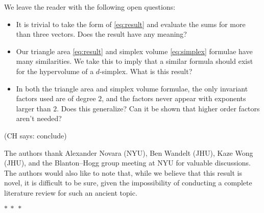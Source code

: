 \documentclass[12pt]{article}
\newcommand{\CH}[1]{{\color{blue} (CH says: #1)}}
\begin{document}
We leave the reader with the following open questions:
\begin{itemize}
    \item It is trivial to take the form of \eqref{eq:result} and evaluate the sums for more than three vectors. Does the result have any meaning?

    \item Our triangle area \eqref{eq:result} and simplex volume \eqref{eq:simplex} formulae have many similarities. We take this to imply that a similar formula should exist for the hypervolume of a $d$-simplex. What is this result?

    \item In both the triangle area and simplex volume formulae, the only invariant factors used are of degree $2$, and the factors never appear with exponents larger than $2$. Does this generalize? Can it be shown that higher order factors aren't needed?
\end{itemize}

\CH{conclude}

The authors thank Alexander Novara (NYU), Ben Wandelt (JHU), Kaze Wong (JHU), and the Blanton--Hogg group meeting at NYU for valuable discussions. The authors would also like to note that, while we believe that this result is novel, it is difficult to be sure, given the impossibility of conducting a complete literature review for such an ancient topic.

\bigskip
{\centering $\ast~\ast~\ast$ \par}

\renewcommand{\section}[2]{}%
{\small\singlespacing}
\end{document}
